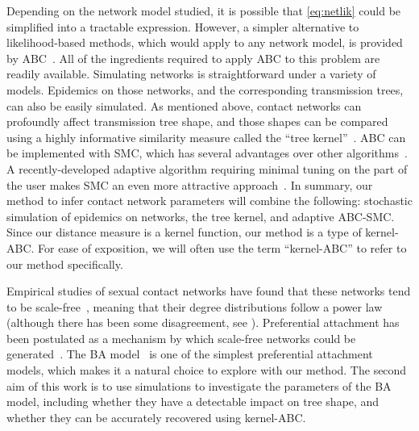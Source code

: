 Depending on the network model studied, it is possible that \cref{eq:netlik}
could be simplified into a tractable expression. However, a simpler alternative
to likelihood-based methods, which would apply to any network model, is
provided by
\gls{ABC}~\autocite{rubin1984bayesianly,tavare1997inferring,fu1997estimating,beaumont2002approximate}.
All of the ingredients required to apply \gls{ABC} to this problem are readily
available. Simulating networks is straightforward under a variety of models.
Epidemics on those networks, and the corresponding transmission trees, can also
be easily simulated. As mentioned above, contact networks can profoundly affect
transmission tree shape, and those shapes can be compared using a highly
informative similarity measure called the ``tree
kernel''~\autocite{poon2013mapping}. \Gls{ABC} can be implemented with
\gls{SMC}, which has several advantages over other
algorithms~\autocite{mckinley2009inference}. A recently-developed adaptive
algorithm requiring minimal tuning on the part of the user makes \gls{SMC} an
even more attractive approach~\autocite{del2012adaptive}. In summary, our
method to infer contact network parameters will combine the following:
stochastic simulation of epidemics on networks, the tree kernel, and adaptive
\gls{ABC}-\gls{SMC}. Since our distance measure is a kernel function, our
method is a type of kernel-\gls{ABC}. For ease of exposition, we will often use
the term ``kernel-\gls{ABC}'' to refer to our method specifically.

Empirical studies of sexual contact networks have found that these networks
tend to be scale-free~\autocite{colgate1989risk, liljeros2001web,
schneeberger2004scale}, meaning that their degree distributions follow a power
law (although there has been some disagreement, see
\autocite{handcock2004likelihood, bansal2007individual}). Preferential
attachment has been postulated as a mechanism by which scale-free networks
could be generated~\autocite{barabasi1999emergence}. The \gls{BA}
model~\autocite{barabasi1999emergence} is one of the simplest preferential
attachment models, which makes it a natural choice to explore with our method.
The second aim of this work is to use simulations to investigate the parameters
of the \gls{BA} model, including whether they have a detectable impact on tree
shape, and whether they can be accurately recovered using kernel-\gls{ABC}.


